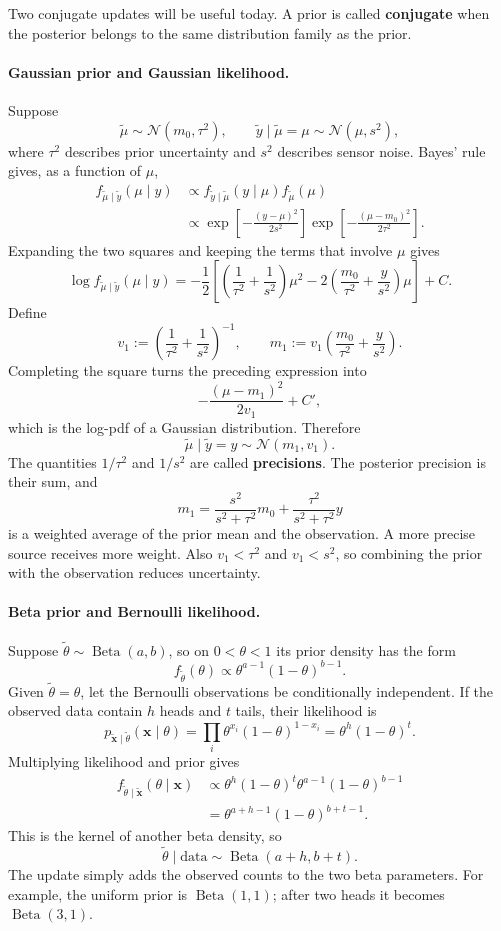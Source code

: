 \documentclass[11pt]{article}
\newcommand{\rv}[1]{\widetilde{#1}}
\newcommand{\rvv}[1]{\widetilde{\bm{#1}}}
\begin{document}
Two conjugate updates will be useful today.  A prior is called
\textbf{conjugate} when the posterior belongs to the same distribution family
as the prior.

\paragraph{Gaussian prior and Gaussian likelihood.}
Suppose
\[
  \rv{\mu}\sim\mathcal N(m_0,\tau^2),
  \qquad
  \rv{y}\mid\rv{\mu}=\mu\sim\mathcal N(\mu,s^2),
\]
where $\tau^2$ describes prior uncertainty and $s^2$ describes sensor noise.
Bayes' rule gives, as a function of $\mu$,
\begin{align*}
  f_{\rv{\mu}\mid\rv{y}}(\mu\mid y)
  &\propto f_{\rv{y}\mid\rv{\mu}}(y\mid\mu)f_{\rv{\mu}}(\mu)\\
  &\propto
  \exp\!\left[-\frac{(y-\mu)^2}{2s^2}\right]
  \exp\!\left[-\frac{(\mu-m_0)^2}{2\tau^2}\right].
\end{align*}
Expanding the two squares and keeping the terms that involve $\mu$ gives
\[
  \log f_{\rv{\mu}\mid\rv{y}}(\mu\mid y)
  =-\frac12\left[
    \left(\frac1{\tau^2}+\frac1{s^2}\right)\mu^2
    -2\left(\frac{m_0}{\tau^2}+\frac{y}{s^2}\right)\mu
  \right]+C.
\]
Define
\[
  v_1:=\left(\frac1{\tau^2}+\frac1{s^2}\right)^{-1},
  \qquad
  m_1:=v_1\left(\frac{m_0}{\tau^2}+\frac{y}{s^2}\right).
\]
Completing the square turns the preceding expression into
\[
  -\frac{(\mu-m_1)^2}{2v_1}+C',
\]
which is the log-pdf of a Gaussian distribution.  Therefore
\[
  \boxed{\rv{\mu}\mid\rv{y}=y\sim\mathcal N(m_1,v_1).}
\]
The quantities $1/\tau^2$ and $1/s^2$ are called \textbf{precisions}.  The
posterior precision is their sum, and
\[
  m_1=\frac{s^2}{s^2+\tau^2}m_0
      +\frac{\tau^2}{s^2+\tau^2}y
\]
is a weighted average of the prior mean and the observation.  A more precise
source receives more weight.  Also $v_1<\tau^2$ and $v_1<s^2$, so combining
the prior with the observation reduces uncertainty.

\paragraph{Beta prior and Bernoulli likelihood.}
Suppose $\rv{\theta}\sim\operatorname{Beta}(a,b)$, so on $0<\theta<1$ its
prior density has the form
\[
  f_{\rv{\theta}}(\theta)\propto
  \theta^{a-1}(1-\theta)^{b-1}.
\]
Given $\rv{\theta}=\theta$, let the Bernoulli observations be conditionally
independent.  If the observed data contain $h$ heads and $t$ tails, their
likelihood is
\[
  p_{\rvv{x}\mid\rv{\theta}}(\bm{x}\mid\theta)
  =\prod_i\theta^{x_i}(1-\theta)^{1-x_i}
  =\theta^h(1-\theta)^t.
\]
Multiplying likelihood and prior gives
\begin{align*}
  f_{\rv{\theta}\mid\rvv{x}}(\theta\mid\bm{x})
  &\propto \theta^h(1-\theta)^t
    \theta^{a-1}(1-\theta)^{b-1}\\
  &=\theta^{a+h-1}(1-\theta)^{b+t-1}.
\end{align*}
This is the kernel of another beta density, so
\[
  \boxed{\rv{\theta}\mid\text{data}
    \sim\operatorname{Beta}(a+h,b+t).}
\]
The update simply adds the observed counts to the two beta parameters.  For
example, the uniform prior is $\operatorname{Beta}(1,1)$; after two heads it
becomes $\operatorname{Beta}(3,1)$.
\end{document}
